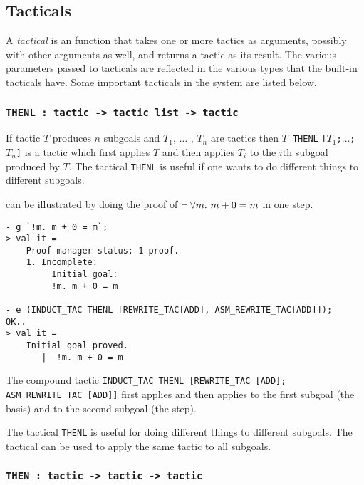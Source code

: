 \subsection{Tacticals}
\label{tacticals}

A {\it tactical\/} is an \ML{} function that takes one or more tactics
as arguments, possibly with other arguments as well, and returns a
tactic as its result.  The various parameters passed to tacticals are
reflected in the various \ML{} types that the built-in tacticals have.
Some important tacticals in the \HOL{} system are listed below.

\subsubsection{\tt THENL : tactic -> tactic list -> tactic}

If tactic $T$ produces $n$ subgoals and $T_1$, $\ldots$ , $T_n$ are
tactics then $T${\small\verb| THENL|}
{\small\verb|[|}$T_1${\small\verb|;|}$\ldots${\small\verb|;|}$T_n${\small\verb|]|}
is a tactic which first applies $T$ and then applies $T_i$ to the
$i$th subgoal produced by $T$.  The tactical {\small\verb|THENL|} is
useful if one wants to do different things to different subgoals.

 can be illustrated by doing the proof of $\vdash \forall m.\ m+0=m$ in
one step.

\setcounter{sessioncount}{0}
\begin{session}\begin{verbatim}
- g `!m. m + 0 = m`;
> val it =
    Proof manager status: 1 proof.
    1. Incomplete:
         Initial goal:
         !m. m + 0 = m

- e (INDUCT_TAC THENL [REWRITE_TAC[ADD], ASM_REWRITE_TAC[ADD]]);
OK..
> val it =
    Initial goal proved.
       |- !m. m + 0 = m
\end{verbatim}\end{session}

\noindent The compound tactic
{\small\verb|INDUCT_TAC THENL [REWRITE_TAC [ADD]; ASM_REWRITE_TAC [ADD]]|}
first applies  and then applies
 to the first subgoal (the basis) and
 to the second subgoal (the step).

The tactical {\small\verb|THENL|} is useful for doing different things
to different subgoals. The tactical  can be used to apply the
same tactic to all subgoals.

\subsubsection{\tt THEN : tactic -> tactic -> tactic}\label{THEN}

